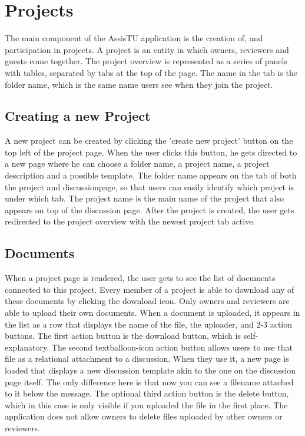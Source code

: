 \section{Projects}

The main component of the AssisTU application is the creation of, and participation in projects. A project is an entity in which owners, reviewers and guests come together. 
The project overview is represented as a series of panels with tables, separated by tabs at the top of the page. The name in the tab is the folder name, which is the same name users see when they join the project. 

\subsection{Creating a new Project}

A new project can be created by clicking the 'create new project' button on the top left of the project page. When the user clicks this button,
he gets directed to a new page where he can choose a folder name, a project name, a project description and a possible template. The folder name
appears on the tab of both the project and discussionpage, so that users can easily identify which project is under which tab. The project
name is the main name of the project that also appears on top of the discussion page. After the project is created, the user gets redirected
to the project overview with the newest project tab active.

\subsection{Documents}

When a project page is rendered, the user gets to see the list of documents connected to this project. Every member of a project is able to download
any of these documents by clicking the download icon. Only owners and reviewers are able to upload their own documents. When a document is uploaded,
it appears in the list as a row that displays the name of the file, the uploader, and 2-3 action buttons. The first action button is the download button, which is self-explanatory. The second textballoon-icon action button allows users to use that file as a relational attachment to a discussion.
When they use it, a new page is loaded that displays a new discussion template akin to the one on the discussion page itself. The only difference here
is that now you can see a filename attached to it below the message. The optional third action button is the delete button, which in this case is
only visible if you uploaded the file in the first place. The application does not allow owners to delete files uploaded by other owners or reviewers.

